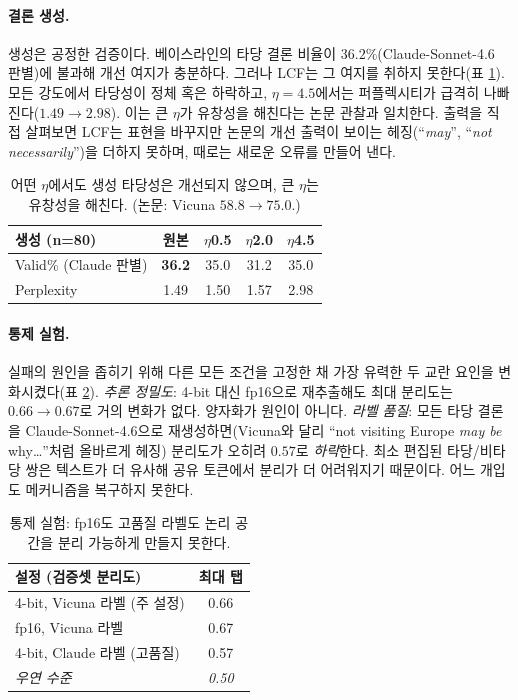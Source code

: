 \documentclass[11pt]{article}
\begin{document}
\paragraph{결론 생성.}
생성은 공정한 검증이다. 베이스라인의 타당 결론 비율이 $36.2\%$(Claude-Sonnet-4.6 판별)에
불과해 개선 여지가 충분하다. 그러나 LCF는 그 여지를 취하지 못한다(표 \ref{tab:gen}).
모든 강도에서 타당성이 정체 혹은 하락하고, $\eta{=}4.5$에서는 퍼플렉시티가 급격히
나빠진다($1.49\!\to\!2.98$). 이는 큰 $\eta$가 유창성을 해친다는 논문 관찰과 일치한다.
출력을 직접 살펴보면 LCF는 표현을 바꾸지만 논문의 개선 출력이 보이는 헤징(``\textit{may}'',
``\textit{not necessarily}'')을 더하지 못하며, 때로는 새로운 오류를 만들어 낸다.

\begin{table}[t]
\centering\small
\begin{tabular}{lcccc}
\toprule
생성 (n=80) & 원본 & $\eta$0.5 & $\eta$2.0 & $\eta$4.5 \\
\midrule
Valid\% (Claude 판별) & \textbf{36.2} & 35.0 & 31.2 & 35.0 \\
Perplexity & 1.49 & 1.50 & 1.57 & 2.98 \\
\bottomrule
\end{tabular}
\caption{어떤 $\eta$에서도 생성 타당성은 개선되지 않으며, 큰 $\eta$는 유창성을 해친다.
(논문: Vicuna $58.8\!\to\!75.0$.)}
\label{tab:gen}
\end{table}

\paragraph{통제 실험.}\label{sec:controlled}
실패의 원인을 좁히기 위해 다른 모든 조건을 고정한 채 가장 유력한 두 교란 요인을
변화시켰다(표 \ref{tab:ctrl}). \emph{추론 정밀도}: 4-bit 대신 fp16으로 재추출해도 최대
분리도는 $0.66\!\to\!0.67$로 거의 변화가 없다. 양자화가 원인이 아니다. \emph{라벨 품질}:
모든 타당 결론을 Claude-Sonnet-4.6으로 재생성하면(Vicuna와 달리 ``not visiting Europe
\emph{may be} why\ldots''처럼 올바르게 헤징) 분리도가 오히려 $0.57$로 \emph{하락}한다.
최소 편집된 타당/비타당 쌍은 텍스트가 더 유사해 공유 토큰에서 분리가 더 어려워지기
때문이다. 어느 개입도 메커니즘을 복구하지 못한다.

\begin{table}[t]
\centering\small
\begin{tabular}{lc}
\toprule
설정 (검증셋 분리도) & 최대 탭 \\
\midrule
4-bit, Vicuna 라벨 (주 설정) & 0.66 \\
fp16, Vicuna 라벨 & 0.67 \\
4-bit, Claude 라벨 (고품질) & 0.57 \\
\textit{우연 수준} & \textit{0.50} \\
\bottomrule
\end{tabular}
\caption{통제 실험: fp16도 고품질 라벨도 논리 공간을 분리 가능하게 만들지 못한다.}
\label{tab:ctrl}
\end{table}
\end{document}
